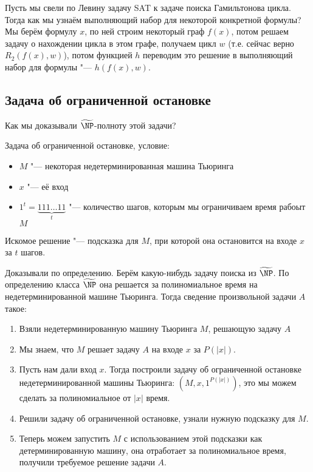 	\begin{exmp}
		Пусть мы свели по Левину задачу SAT к задаче поиска Гамильтонова цикла.
		Тогда как мы узнаём выполняющий набор для некоторой конкретной формулы?
		Мы берём формулу $x$, по ней строим некоторый граф $f(x)$, потом решаем задачу
		о нахождении цикла в этом графе, получаем цикл $w$ (т.е. сейчас верно $R_2(f(x), w)$),
		потом функцией $h$ переводим это решение в выполняющий набор для формулы "--- $h(f(x), w)$.
	\end{exmp}

\subsection{Задача об ограниченной остановке}
	Как мы доказывали $\widetilde{\NP}$-полноту этой задачи?
	\begin{Rem}
		Задача об ограниченной остановке, условие:
		\begin{itemize}
			\item $M$ "--- некоторая недетерминированная машина Тьюринга
			\item $x$ "--- её вход
			\item $1^t = \underbrace{111\dots11}_{t}$ "--- количество шагов, которым мы ограничиваем время рабоыт $M$
		\end{itemize}
		Искомое решение "--- подсказка для $M$, при которой она остановится на входе $x$ за $t$ шагов.
	\end{Rem}
	Доказывали по определению.
	Берём какую-нибудь задачу поиска из $\widetilde{\NP}$.
	По определению класса $\widetilde{\NP}$ она решается за полиномиальное время на недетерминированной машине Тьюринга.
	Тогда сведение произвольной задачи $A$ такое:
	\begin{enumerate}
		\item Взяли недетерминированную машину Тьюринга $M$, решающую задачу $A$
		\item Мы знаем, что $M$ решает задачу $A$ на входе $x$ за $P(|x|)$.
		\item
			Пусть нам дали вход $x$. Тогда построили задачу об ограниченной остановке недетерминированной
			машины Тьюринга: $(M, x, 1^{P(|x|)})$,
			это мы можем сделать за полиномиальное от $|x|$ время.
		\item
			Решили задачу об ограниченной остановке, узнали нужную подсказку для $M$.
		\item
			Теперь можем запустить $M$ с использованием этой подсказки как детерминированную машину,
			она отработает за полиномиальное время, получили требуемое решение задачи $A$.
	\end{enumerate}

